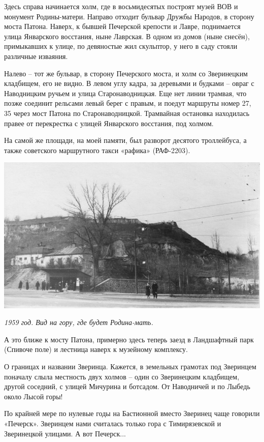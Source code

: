 Здесь справа начинается холм, где в восьмидесятых построят музей ВОВ и монумент Родины-матери. Направо отходит бульвар Дружбы Народов, в сторону моста Патона. Наверх, к бывшей Печерской крепости и Лавре, поднимается улица Январского восстания, ныне Лаврская. В одном из домов (ныне снесён), примыкавших к улице, по девяностые жил скульптор, у него в саду стояли различные изваяния.

Налево – тот же бульвар, в сторону Печерского моста, и холм со Зверинецким кладбищем, его не видно. В левом углу кадра, за деревьями и будками – овраг с Наводницким ручьем и улица Старонаводницкая. Еще нет линии трамвая, что позже соединит рельсами левый берег с правым, и поедут маршруты номер 27, 35 через мост Патона по Старонаводницкой. Трамвайная остановка находилась правее от перекрестка с улицей Январского восстания, под холмом.

На самой же площади, на моей памяти, был разворот десятого троллейбуса, а также советского маршрутного такси «рафика» (РАФ-2203).

\begin{center}
\includegraphics[width=\linewidth]{chast-vosp/zver/1959-navodnic-02.jpg}

\textit{1959 год. Вид на гору, где будет Родина-мать.}
\end{center}

А это ближе к мосту Патона, примерно здесь теперь заезд в Ландшафтный парк (Спивоче поле) и лестница наверх к музейному комплексу.

О границах и названии Зверинца. Кажется, в земельных грамотах под Зверинцем поначалу слыла местность двух холмов – один со Зверинецким кладбищем, другой соседний, с улицей Мичурина и ботсадом. От Наводничей и по Лыбедь около Лысой горы!

По крайней мере по нулевые годы на Бастионной вместо Зверинец чаще говорили «Печерск». Зверинцем нами считалась только гора с Тимирязевской и Зверинецкой улицами. А вот Печерск...


